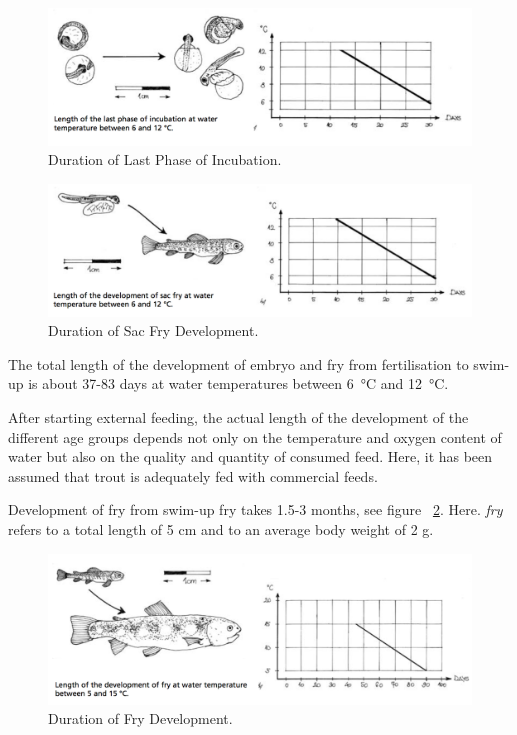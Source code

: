 \begin{figure}[H]
   \centering
   \includegraphics[scale = 0.6]{images/DurationIncubationLastPhase.png}
    \caption{Duration of Last Phase of Incubation.}
   \label{fig:DurationIncubationLastPhase}
\end{figure}

\begin{figure}[H]
   \centering
   \includegraphics[scale = 0.6]{images/DurationSacFry.png}
    \caption{Duration of Sac Fry Development.}
   \label{fig:DurationSacFry}
\end{figure}

The total length of the development of embryo and fry from fertilisation to swim-up is about 37-83 days at water temperatures between  \SI{6}{\celsius} and  \SI{12}{\celsius}.

After starting external feeding, the actual length of the development of the different age groups depends not only on the temperature and oxygen content of water but also on the quality and quantity of consumed feed. Here, it has been assumed that trout is adequately fed with commercial feeds. 

Development of fry from swim-up fry takes 1.5-3 months, see figure ~\ref{fig:DurationSacFry}. Here. {\it fry} refers to a total length of 5 cm and to an average body weight of 2 g.

\begin{figure}[H]
   \centering
   \includegraphics[scale = 0.6]{images/DurationFry.png}
    \caption{Duration of Fry Development.}
   \label{fig:DurationFry}
\end{figure}

